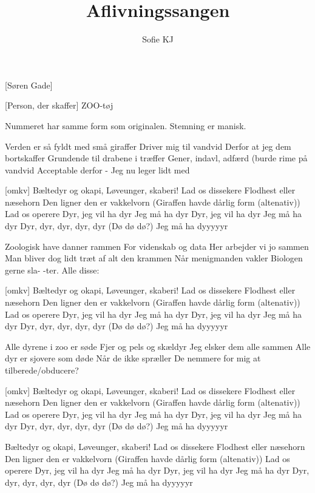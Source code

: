 \documentclass[a4paper,11pt]{article}
\title{Aflivningssangen}
\author{Sofie KJ}
\begin{document}
\maketitle

\begin{roles}
    [Søren Gade]
\end{roles}

\begin{props}
    [Person, der skaffer] ZOO-tøj
\end{props}

\scene{} Nummeret har samme form som originalen. Stemning er manisk.


\begin{song}
Verden er så fyldt med små giraffer			
Driver mig til vandvid				
Derfor at jeg dem bortskaffer				
Grundende til drabene i træffer	
Gener, indavl, adfærd	(burde rime på vandvid
Acceptable derfor			
- Jeg nu leger lidt med		

[omkv]
Bæltedyr og okapi,			
Løveunger, skaberi!	
Lad os dissekere	
Flodhest eller næsehorn		
Den ligner den er vakkelvorn	
(Giraffen havde dårlig form (altenativ))
Lad os operere		
Dyr, jeg vil ha dyr
Jeg må ha dyr				
Dyr, jeg vil ha dyr
Jeg må ha dyr	
Dyr, dyr, dyr, dyr, dyr	 (Dø dø dø?)	
Jeg må ha dyyyyyr	

Zoologisk have danner rammen	
For videnskab og data				
Her arbejder vi jo sammen		
Man bliver dog lidt træt af alt den krammen
Når menigmanden vakler
Biologen gerne sla-
-ter. Alle disse:

[omkv]
Bæltedyr og okapi,
Løveunger, skaberi!
Lad os dissekere
Flodhest eller næsehorn
Den ligner den er vakkelvorn	
(Giraffen havde dårlig form (altenativ))
Lad os operere
Dyr, jeg vil ha dyr
Jeg må ha dyr	
Dyr, jeg vil ha dyr
Jeg må ha dyr	
Dyr, dyr, dyr, dyr, dyr	 (Dø dø dø?)
Jeg må ha dyyyyyr

Alle dyrene i zoo er søde		
Fjer og pels og skældyr
Jeg elsker dem alle sammen		
Alle dyr er sjovere som døde	
Når de ikke spræller
De nemmere for
mig at tilberede/obducere?

[omkv]
Bæltedyr og okapi,
Løveunger, skaberi!	
Lad os dissekere
Flodhest eller næsehorn
Den ligner den er vakkelvorn	
(Giraffen havde dårlig form (altenativ))
Lad os operere
Dyr, jeg vil ha dyr
Jeg må ha dyr	
Dyr, jeg vil ha dyr
Jeg må ha dyr	
Dyr, dyr, dyr, dyr, dyr	 (Dø dø dø?)	
Jeg må ha dyyyyyr	

Bæltedyr og okapi,	
Løveunger, skaberi!	
Lad os dissekere
Flodhest eller næsehorn
Den ligner den er vakkelvorn	
(Giraffen havde dårlig form (altenativ))
Lad os operere
Dyr, jeg vil ha dyr
Jeg må ha dyr	
Dyr, jeg vil ha dyr
Jeg må ha dyr	
Dyr, dyr, dyr, dyr, dyr	 (Dø dø dø?)
Jeg må ha dyyyyyr
\end{song}
\end{document}
